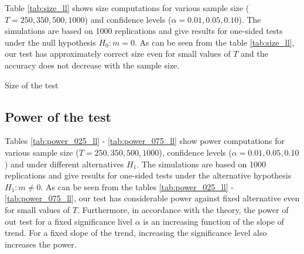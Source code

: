 Table \ref{tab:size_ll} shows size computations for various sample size ($T = 250, 350, 500, 1000$) and confidence levels ($\alpha = 0.01, 0.05, 0.10$). The simulations are based on 1000 replications and give results for one-sided tests under the null hypothesis $H_0: m=0$. As can be seen from the table \ref{tab:size_ll}, our test has approximately correct size even for small values of $T$ and the accuracy does not decrease with the sample size.
 
\begin{table}[H]
    \begin{center}
        \caption{Size of the test}
        \label{tab:size_ll}
        \centering
        
    \end{center}
\end{table}

\subsection{Power of the test}\label{subsec-sim-power}

Tables \ref{tab:power_025_ll} - \ref{tab:power_075_ll} show power computations for various sample size ($T = 250, 350, 500, 1000$), confidence levels ($\alpha = 0.01, 0.05, 0.10$) and under different alternatives $H_1$. The simulations are based on 1000 replications and give results for one-sided tests under the alternative hypothesis $H_1: m \ne 0$. As can be seen from the tables \ref{tab:power_025_ll} - \ref{tab:power_075_ll}, our test has considerable power against fixed alternative even for small values of $T$. Furthermore, in accordance with the theory, the power of out test for a fixed significance livel $\alpha$ is an increasing function of the slope of trend. For a fixed slope of the trend, increasing the significance level also increases the power.


